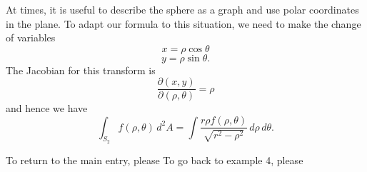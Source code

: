 \documentclass[12pt]{article}
\begin{document}
At times, it is useful to describe the sphere as a graph and use polar coordinates in the plane.  To adapt our formula to this situation, we need to make the change of variables
 $$x = \rho \cos \theta$$
 $$y = \rho \sin \theta.$$
The Jacobian for this transform is 
 $$\frac{\partial(x, y)}{\partial(\rho, \theta)} = \rho$$
and hence we have
 $$\int_{S_2} f(\rho, \theta) \, d^2 A = \int \frac{r \rho f(\rho, \theta)}{\sqrt{ r^2 - \rho^2 }} \, d\rho \, d\theta.$$

To return to the main entry, please 
To go back to example 4, please 
\end{document}
